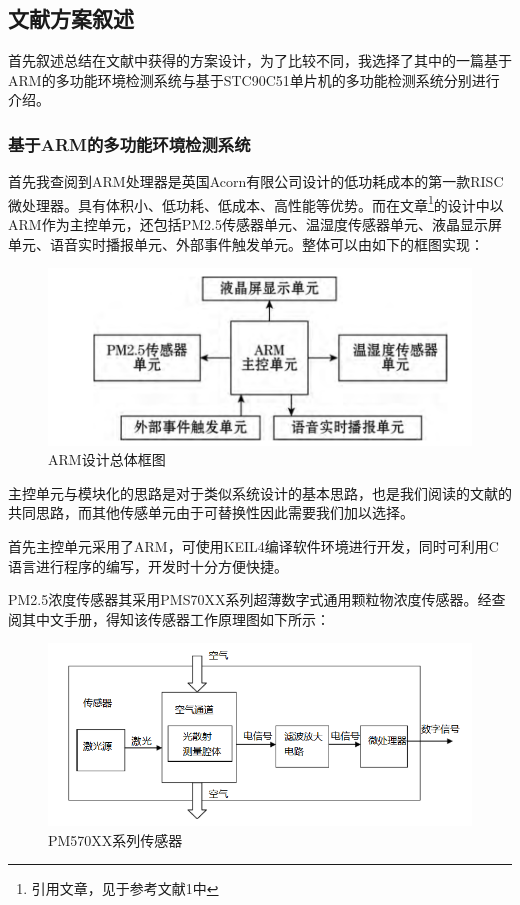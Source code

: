 \documentclass[12pt]{ctexart}
\begin{document}
\subsection{文献方案叙述}
\par{} 首先叙述总结在文献中获得的方案设计，为了比较不同，我选择了其中的一篇基于ARM的多功能环境检测系统与基于STC90C51单片机的多功能检测系统分别进行介绍。
\subsubsection{基于ARM的多功能环境检测系统}
\par{} 首先我查阅到ARM处理器是英国Acorn有限公司设计的低功耗成本的第一款RISC微处理器。具有体积小、低功耗、低成本、高性能等优势。而在文章\footnote{引用文章，见于参考文献1中}的设计中以ARM作为主控单元，还包括PM2.5传感器单元、温湿度传感器单元、液晶显示屏单元、语音实时播报单元、外部事件触发单元\cite{曲爱玲2017基于}。整体可以由如下的框图实现：
\begin{figure}[H]
  \centering
  \includegraphics[scale = 0.7 ]{1-2.png}
  \caption{ARM设计总体框图}
  \label{img2} 
\end{figure}
\par{} 主控单元与模块化的思路是对于类似系统设计的基本思路，也是我们阅读的文献的共同思路，而其他传感单元由于可替换性因此需要我们加以选择。
\par{} 首先主控单元采用了ARM，可使用KEIL4编译软件环境进行开发，同时可利用C语言进行程序的编写，开发时十分方便快捷。
\par{} PM2.5浓度传感器其采用PMS70XX系列超薄数字式通用颗粒物浓度传感器。经查阅其中文手册，得知该传感器工作原理图如下所示：
\begin{figure}[H]
  \centering
  \includegraphics[scale = 0.65 ]{1-3.png}
  \caption{PM570XX系列传感器}
  \label{img3} 
\end{figure}
\end{document}
